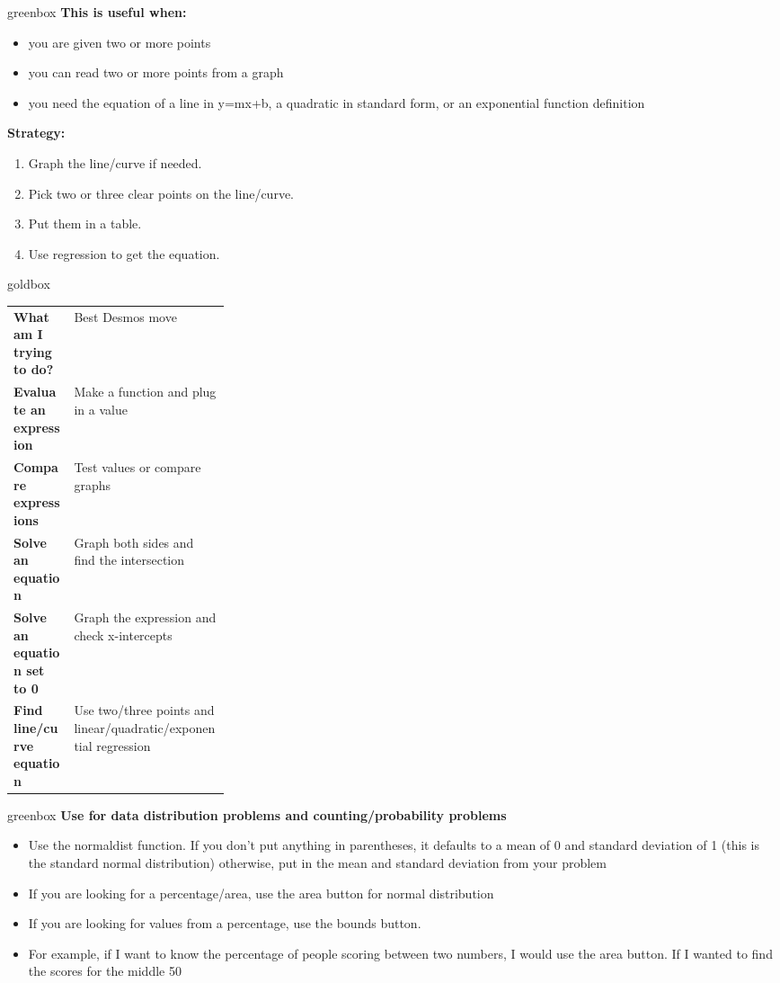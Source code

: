 \documentclass[11pt]{article}
\begin{document}
\begin{multicols}{2}
\begin{skillbox}[3. Regressions]{greenbox}
\textbf{This is useful when:}
\begin{itemize}
  \item you are given two or more points
  \item you can read two or more points from a graph
  \item you need the equation of a line in y=mx+b, a quadratic in standard form, or an exponential function definition
\end{itemize}

\textbf{Strategy:}
\begin{enumerate}
  \item Graph the line/curve if needed.
  \item Pick two or three clear points on the line/curve.
  \item Put them in a table.
  \item Use regression to get the equation.
\end{enumerate}

\end{skillbox}

\begin{skillbox}{goldbox}
\begin{tabularx}{\linewidth}{>{\bfseries}p{0.28\linewidth}X}
What am I trying to do? & Best Desmos move \\
Evaluate an expression & Make a function and plug in a value \\
Compare expressions & Test values or compare graphs \\
Solve an equation & Graph both sides and find the intersection \\
Solve an equation set to 0 & Graph the expression and check x-intercepts \\
Find line/curve equation & Use two/three points and linear/quadratic/exponential regression \\
\end{tabularx}
\end{skillbox}


\columnbreak

\begin{skillbox}{greenbox}
\textbf{ Use for data distribution problems and counting/probability problems}
\begin{itemize}
  \item Use the normaldist function.  If you don't put anything in parentheses, it defaults to a mean of 0 and standard deviation of 1 (this is the standard normal distribution) otherwise, put in the mean and standard deviation from your problem
  \item If you are looking for a percentage/area, use the area button for normal distribution
  \item If you are looking for values from a percentage, use the bounds button.
  \item For example, if I want to know the percentage of people scoring between two numbers, I would use the area button.  If I wanted to find the scores for the middle 50%
\end{itemize}


\end{skillbox}
\end{multicols}
\end{document}
